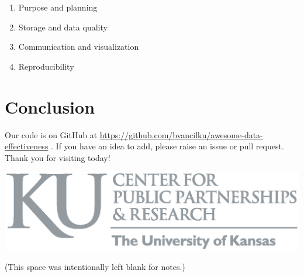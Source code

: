 \documentclass[a0paper,fleqn]{betterposter-latex-template/betterposter}
\begin{document}
{\begin{enumerate}
    \item Purpose and planning
    \item Storage and data quality
    \item Communication and visualization
    \item Reproducibility
\end{enumerate}

\section{Conclusion}

Our code is on GitHub at \url{https://github.com/bvancilku/awesome-data-effectiveness} . If you have an idea to add, please raise an issue or pull request. Thank you for visiting today!

\vfill

\includegraphics[width=\textwidth]{img/cppr-gray-01.eps}\\

}{

(This space was intentionally left blank for notes.)
}
\end{document}
